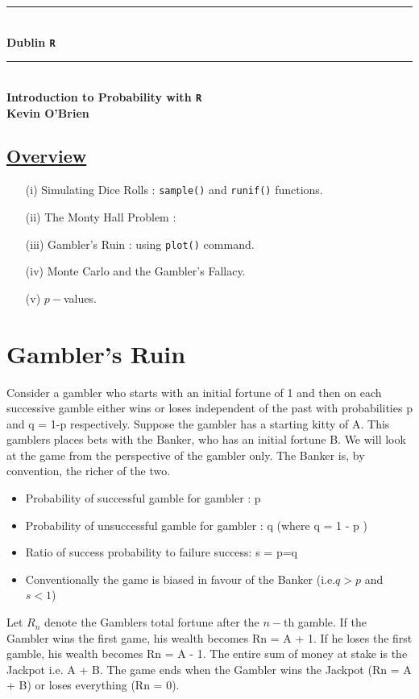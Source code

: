 \documentclass[12pt,a4paper]{article}
\newcommand{\HRule}{\rule{\linewidth}{0.5mm}}
\begin{document}
\begin{center}
{\HRule} ~\\[0.1cm]
{\textbf\bfseries{\LARGE Dublin \texttt{R}}}
\HRule
\newline
\\[0.3in]
{\textbf{\Large{Introduction to Probability with \texttt{R}}}}
\\[0.3in]
{\textbf{Kevin O'Brien}}
\\[0.3in]
\end{center}
\begin{center}
\section*{\underline{Overview}}
\end{center}
\newpage
\begin{itemize}
\item[(i)] Simulating Dice Rolls : \texttt{sample()} and \texttt{runif()} functions.
\item[(ii)] The Monty Hall Problem : 
\item[(iii)] Gambler's Ruin : using \texttt{plot()} command.
\item[(iv)] Monte Carlo and the Gambler's Fallacy.
\item[(v)] $p-$values.
\end{itemize}
\newpage
\section{Gambler's Ruin}
Consider a gambler who starts with an initial fortune of 1 and then on each successive gamble
either wins  or loses independent of the past with probabilities p and q = 1-p respectively.
Suppose the gambler has a starting kitty of A. This gamblers places bets with the Banker,
who has an initial fortune B. We will look at the game from the perspective of the gambler
only. The Banker is, by convention, the richer of the two.


\begin{itemize}
\item Probability of successful gamble for gambler : p
\item Probability of unsuccessful gamble for gambler : q (where q = 1 - p )
\item Ratio of success probability to failure success: s = p=q
\item Conventionally the game is biased in favour of the Banker (i.e.$ q > p$ and $s < 1$)
\end{itemize}
Let $R_n$ denote the Gamblers total fortune after the $n-$th gamble.
If the Gambler wins the first game, his wealth becomes Rn = A + 1. If he loses the first
gamble, his wealth becomes Rn = A - 1. The entire sum of money at stake is the Jackpot i.e.
A + B. The game ends when the Gambler wins the Jackpot (Rn = A + B) or loses everything
(Rn = 0).
\end{document}
